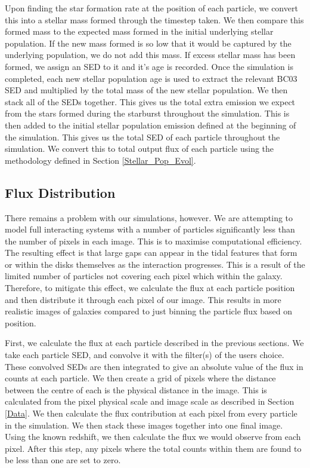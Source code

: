 Upon finding the star formation rate at the position of each particle, we convert this into a stellar mass formed through the timestep taken. We then compare this formed mass to the expected mass formed in the initial underlying stellar population. If the new mass formed is so low that it would be captured by the underlying population, we do not add this mass. If excess stellar mass has been formed, we assign an SED to it and it's age is recorded. Once the simulation is completed, each new stellar population age is used to extract the relevant BC03 SED and multiplied by the total mass of the new stellar population. We then stack all of the SEDs together. This gives us the total extra emission we expect from the stars formed during the starburst throughout the simulation. This is then added to the initial stellar population emission defined at the beginning of the simulation. This gives us the total SED of each particle throughout the simulation. We convert this to total output flux of each particle using the methodology defined in Section \ref{Stellar_Pop_Evol}.

\subsection{Flux Distribution}\label{flux_dist}
\noindent There remains a problem with our simulations, however. We are attempting to model full interacting systems with a number of particles significantly less than the number of pixels in each image. This is to maximise computational efficiency. The resulting effect is that large gaps can appear in the tidal features that form or within the disks themselves as the interaction progresses. This is a result of the limited number of particles not covering each pixel which within the galaxy. Therefore, to mitigate this effect, we calculate the flux at each particle position and then distribute it through each pixel of our image. This results in more realistic images of galaxies compared to just binning the particle flux based on position.

First, we calculate the flux at each particle described in the previous sections. We take each particle SED, and convolve it with the filter(s) of the users choice. These convolved SEDs are then integrated to give an absolute value of the flux in counts at each particle. We then create a grid of pixels where the distance between the centre of each is the physical distance in the image. This is calculated from the pixel physical scale and image scale as described in Section \ref{Data}. We then calculate the flux contribution at each pixel from every particle in the simulation. We then stack these images together into one final image. Using the known redshift, we then calculate the flux we would observe from each pixel. After this step, any pixels where the total counts within them are found to be less than one are set to zero.

